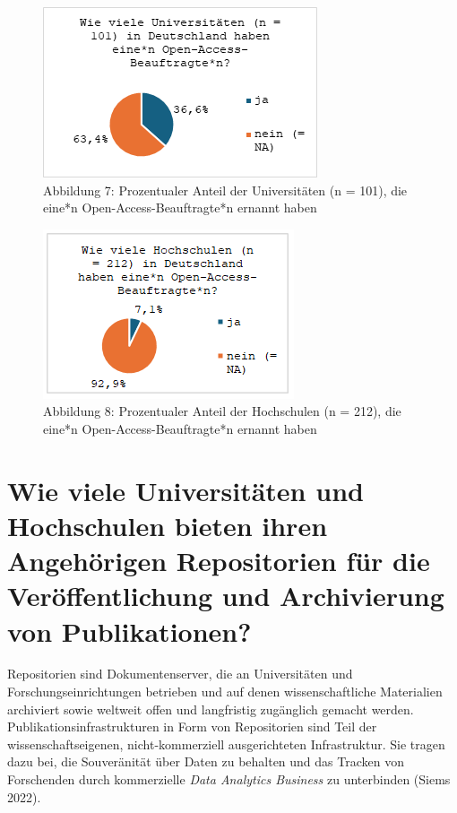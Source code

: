 \documentclass[a4paper,
fontsize=11pt,
oneside,
numbers=noperiodatend,
parskip=half-,
bibliography=totoc,
final
]{scrartcl}
\begin{document}
\begin{figure}[H]
\centering
\includegraphics[]{img/image008.png}
\caption{Abbildung 7: Prozentualer Anteil der Universitäten (n = 101), die eine*n Open-Access-Beauftragte*n ernannt haben}
\end{figure}

\begin{figure}[H]
\centering
\includegraphics[]{img/image007.png}
\caption{Abbildung 8: Prozentualer Anteil der Hochschulen (n = 212), die eine*n Open-Access-Beauftragte*n ernannt haben}
\end{figure}

\section{Wie viele Universitäten und Hochschulen bieten ihren
Angehörigen Repositorien für die Veröffentlichung und Archivierung von
Publikationen?}\label{wie-viele-universituxe4ten-und-hochschulen-bieten-ihren-angehuxf6rigen-repositorien-fuxfcr-die-veruxf6ffentlichung-und-archivierung-von-publikationen}

Repositorien sind Dokumentenserver, die an Universitäten und
Forschungseinrichtungen betrieben und auf denen wissenschaftliche
Materialien archiviert sowie weltweit offen und langfristig zugänglich
gemacht werden. Publikationsinfrastrukturen in Form von Repositorien
sind Teil der wissenschaftseigenen, nicht-kommerziell ausgerichteten
Infrastruktur. Sie tragen dazu bei, die Souveränität über Daten zu
behalten und das Tracken von Forschenden durch kommerzielle \emph{Data
Analytics Business} zu unterbinden (Siems 2022).
\end{document}
